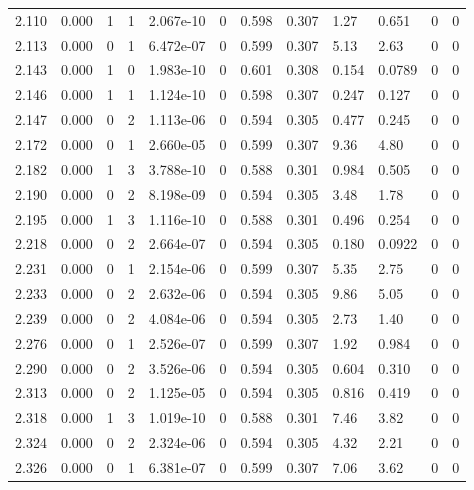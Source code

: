 \documentclass[preview]{standalone}
\begin{document}
{{{{{\begin{tabular}{L{1.2cm}C{1.2cm} C{0.3cm}C{0.5cm} C{1.4cm}C{1.4cm} C{1.4cm}C{1.4cm} C{1.6cm}C{1.6cm} C{1.6cm}C{1.6cm}}
  2.110  &  0.000  & 1     &  1 &  2.067e-10  & 0  &  0.598&   0.307& 1.27 & 0.651   &  0 & 0  \\ 
  2.113  &  0.000  & 0     &  1 &  6.472e-07  & 0  &  0.599&   0.307& 5.13 & 2.63   &  0 & 0  \\ 
  2.143  &  0.000  & 1     &  0 &  1.983e-10  & 0  &  0.601&   0.308& 0.154 & 0.0789   &  0 & 0  \\ 
  2.146  &  0.000  & 1     &  1 &  1.124e-10  & 0  &  0.598&   0.307& 0.247 & 0.127   &  0 & 0  \\ 
  2.147  &  0.000  & 0     &  2 &  1.113e-06  & 0  &  0.594&   0.305& 0.477 & 0.245   &  0 & 0  \\ 
  2.172  &  0.000  & 0     &  1 &  2.660e-05  & 0  &  0.599&   0.307& 9.36 & 4.80   &  0 & 0  \\ 
  2.182  &  0.000  & 1     &  3 &  3.788e-10  & 0  &  0.588&   0.301& 0.984 & 0.505   &  0 & 0  \\ 
  2.190  &  0.000  & 0     &  2 &  8.198e-09  & 0  &  0.594&   0.305& 3.48 & 1.78   &  0 & 0  \\ 
  2.195  &  0.000  & 1     &  3 &  1.116e-10  & 0  &  0.588&   0.301& 0.496 & 0.254   &  0 & 0  \\ 
  2.218  &  0.000  & 0     &  2 &  2.664e-07  & 0  &  0.594&   0.305& 0.180 & 0.0922   &  0 & 0  \\ 
  2.231  &  0.000  & 0     &  1 &  2.154e-06  & 0  &  0.599&   0.307& 5.35 & 2.75   &  0 & 0  \\ 
  2.233  &  0.000  & 0     &  2 &  2.632e-06  & 0  &  0.594&   0.305& 9.86 & 5.05   &  0 & 0  \\ 
  2.239  &  0.000  & 0     &  2 &  4.084e-06  & 0  &  0.594&   0.305& 2.73 & 1.40   &  0 & 0  \\ 
  2.276  &  0.000  & 0     &  1 &  2.526e-07  & 0  &  0.599&   0.307& 1.92 & 0.984   &  0 & 0  \\ 
  2.290  &  0.000  & 0     &  2 &  3.526e-06  & 0  &  0.594&   0.305& 0.604 & 0.310   &  0 & 0  \\ 
  2.313  &  0.000  & 0     &  2 &  1.125e-05  & 0  &  0.594&   0.305& 0.816 & 0.419   &  0 & 0  \\ 
  2.318  &  0.000  & 1     &  3 &  1.019e-10  & 0  &  0.588&   0.301& 7.46 & 3.82   &  0 & 0  \\ 
  2.324  &  0.000  & 0     &  2 &  2.324e-06  & 0  &  0.594&   0.305& 4.32 & 2.21   &  0 & 0  \\ 
  2.326  &  0.000  & 0     &  1 &  6.381e-07  & 0  &  0.599&   0.307& 7.06 & 3.62   &  0 & 0  \\ 

\end{tabular}}}}}}
\end{document}
